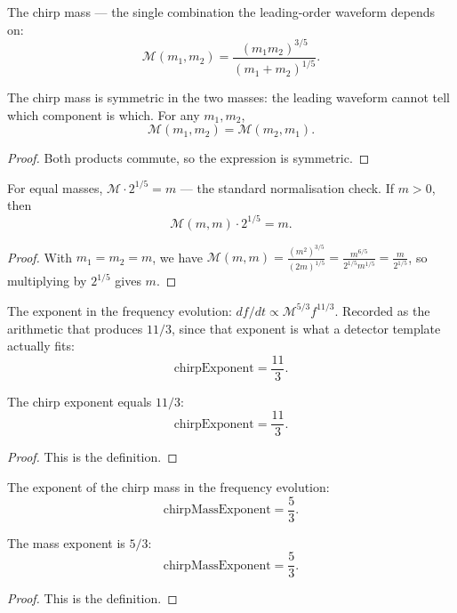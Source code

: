 \begin{definition}
The chirp mass — the single combination the leading-order waveform depends on:
\[
\mathcal{M}(m_1, m_2) = \frac{(m_1 m_2)^{3/5}}{(m_1 + m_2)^{1/5}}.
\]
\end{definition}

\begin{theorem}
The chirp mass is symmetric in the two masses: the leading waveform cannot tell which component is which. For any $m_1, m_2$,
\[
\mathcal{M}(m_1, m_2) = \mathcal{M}(m_2, m_1).
\]
\begin{proof}
Both products commute, so the expression is symmetric.
\end{proof}
\end{theorem}

\begin{theorem}
For equal masses, $\mathcal{M} \cdot 2^{1/5} = m$ — the standard normalisation check. If $m > 0$, then
\[
\mathcal{M}(m, m) \cdot 2^{1/5} = m.
\]
\begin{proof}
With $m_1 = m_2 = m$, we have $\mathcal{M}(m,m) = \frac{(m^2)^{3/5}}{(2m)^{1/5}} = \frac{m^{6/5}}{2^{1/5} m^{1/5}} = \frac{m}{2^{1/5}}$, so multiplying by $2^{1/5}$ gives $m$.
\end{proof}
\end{theorem}

\begin{definition}
The exponent in the frequency evolution: $df/dt \propto \mathcal{M}^{5/3} f^{11/3}$. Recorded as the arithmetic that produces $11/3$, since that exponent is what a detector template actually fits:
\[
\text{chirpExponent} = \frac{11}{3}.
\]
\end{definition}

\begin{theorem}
The chirp exponent equals $11/3$:
\[
\text{chirpExponent} = \frac{11}{3}.
\]
\begin{proof}
This is the definition.
\end{proof}
\end{theorem}

\begin{definition}
The exponent of the chirp mass in the frequency evolution:
\[
\text{chirpMassExponent} = \frac{5}{3}.
\]
\end{definition}

\begin{theorem}
The mass exponent is $5/3$:
\[
\text{chirpMassExponent} = \frac{5}{3}.
\]
\begin{proof}
This is the definition.
\end{proof}
\end{theorem}

